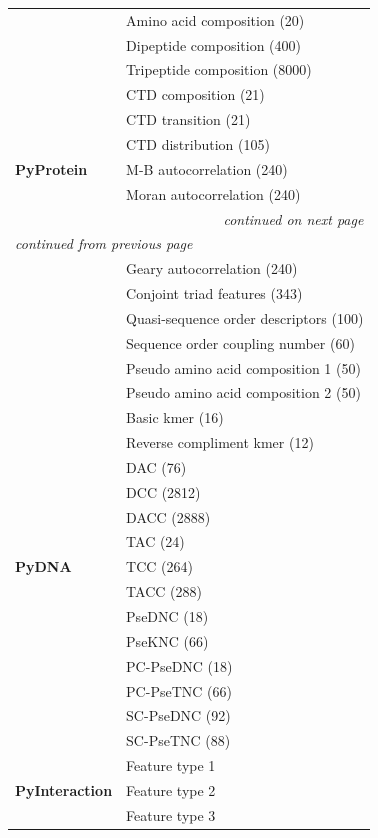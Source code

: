 \documentclass[letterpaper,10pt,english]{sphinxmanual}
\begin{document}
\begin{longtable}{| p{2.5cm}<{\centering} | p{10cm} |}
	
	& Amino acid composition (20) \\
	& Dipeptide composition (400) \\
	& Tripeptide composition (8000) \\
	& CTD composition (21) \\
	& CTD transition (21) \\
	& CTD distribution (105) \\
	\textbf{PyProtein} & M-B autocorrelation (240) \\
	& Moran autocorrelation (240) \\\hline
	\multicolumn{2}{|r|}{\small\sl continued on next page}\\\hline
	\multicolumn{2}{|l|}{\small\sl continued from previous page}\\\hline
	& Geary autocorrelation (240) \\
	& Conjoint triad features (343) \\
	& Quasi-sequence order descriptors (100) \\
	& Sequence order coupling number (60) \\
	& Pseudo amino acid composition 1 (50) \\
	& Pseudo amino acid composition 2 (50) \\\hline
	
	
	& Basic kmer (16)\\
	& Reverse compliment kmer (12)\\
	& DAC (76)\\
	& DCC (2812)\\
	& DACC (2888)\\
	& TAC (24)\\
	\textbf{PyDNA} & TCC (264)\\
	& TACC (288)\\
	& PseDNC (18)\\
	& PseKNC (66)\\
	& PC-PseDNC (18)\\
	& PC-PseTNC (66)\\
	& SC-PseDNC (92)\\
	& SC-PseTNC (88)\\
	\hline
	
	
	& Feature type 1 \\
	\textbf{PyInteraction} & Feature type 2 \\
	& Feature type 3 \\\hline
	
\end{longtable}
\end{document}
